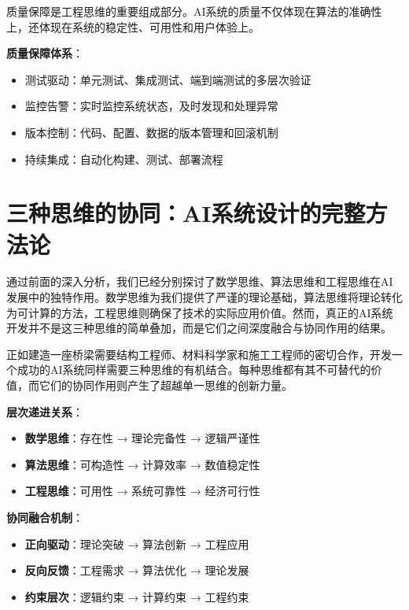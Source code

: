 质量保障是工程思维的重要组成部分。AI系统的质量不仅体现在算法的准确性上，还体现在系统的稳定性、可用性和用户体验上。

\textbf{质量保障体系}：
\begin{itemize}
\item 测试驱动：单元测试、集成测试、端到端测试的多层次验证
\item 监控告警：实时监控系统状态，及时发现和处理异常
\item 版本控制：代码、配置、数据的版本管理和回滚机制
\item 持续集成：自动化构建、测试、部署流程
\end{itemize}

\section{三种思维的协同：AI系统设计的完整方法论}

通过前面的深入分析，我们已经分别探讨了数学思维、算法思维和工程思维在AI发展中的独特作用。数学思维为我们提供了严谨的理论基础，算法思维将理论转化为可计算的方法，工程思维则确保了技术的实际应用价值。然而，真正的AI系统开发并不是这三种思维的简单叠加，而是它们之间深度融合与协同作用的结果。

正如建造一座桥梁需要结构工程师、材料科学家和施工工程师的密切合作，开发一个成功的AI系统同样需要三种思维的有机结合。每种思维都有其不可替代的价值，而它们的协同作用则产生了超越单一思维的创新力量。

\begin{tcolorbox}[colback=blue!5!white,colframe=blue!75!black,title=核心要点：三种思维的层次递进与协同融合]
\textbf{层次递进关系}：
\begin{itemize}
\item \textbf{数学思维}：存在性 → 理论完备性 → 逻辑严谨性
\item \textbf{算法思维}：可构造性 → 计算效率 → 数值稳定性
\item \textbf{工程思维}：可用性 → 系统可靠性 → 经济可行性
\end{itemize}

\textbf{协同融合机制}：
\begin{itemize}
\item \textbf{正向驱动}：理论突破 → 算法创新 → 工程应用
\item \textbf{反向反馈}：工程需求 → 算法优化 → 理论发展
\item \textbf{约束层次}：逻辑约束 → 计算约束 → 工程约束
\end{itemize}
\end{tcolorbox}

